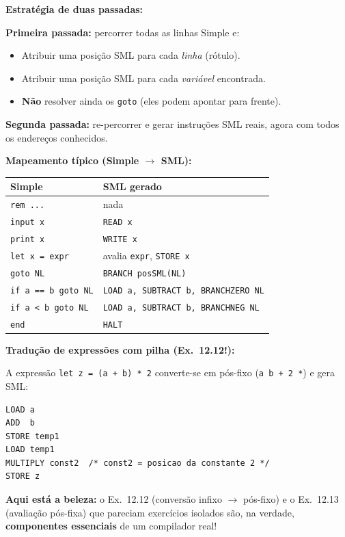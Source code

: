 \documentclass[12pt,a4paper]{article}
\begin{document}
\begin{respostabox}
\textbf{Estratégia de duas passadas:}

\textbf{Primeira passada:} percorrer todas as linhas Simple e:
\begin{itemize}[noitemsep]
  \item Atribuir uma posição SML para cada \textit{linha} (rótulo).
  \item Atribuir uma posição SML para cada \textit{variável} encontrada.
  \item \textbf{Não} resolver ainda os \texttt{goto} (eles podem apontar
  para frente).
\end{itemize}

\textbf{Segunda passada:} re-percorrer e gerar instruções SML reais, agora com
todos os endereços conhecidos.

\textbf{Mapeamento típico (Simple $\to$ SML):}

\begin{center}
\renewcommand{\arraystretch}{1.3}
\begin{tabular}{l l}
\toprule
\textbf{Simple} & \textbf{SML gerado} \\ \midrule
\texttt{rem ...}              & nada \\
\texttt{input x}              & \texttt{READ x} \\
\texttt{print x}              & \texttt{WRITE x} \\
\texttt{let x = expr}         & avalia \texttt{expr}, \texttt{STORE x} \\
\texttt{goto NL}              & \texttt{BRANCH posSML(NL)} \\
\texttt{if a == b goto NL}    & \texttt{LOAD a, SUBTRACT b, BRANCHZERO NL} \\
\texttt{if a < b goto NL}     & \texttt{LOAD a, SUBTRACT b, BRANCHNEG NL} \\
\texttt{end}                  & \texttt{HALT} \\
\bottomrule
\end{tabular}
\end{center}

\textbf{Tradução de expressões com pilha (Ex.~12.12!):}

A expressão \texttt{let z = (a + b) * 2} converte-se em pós-fixo
(\texttt{a b + 2 *}) e gera SML:
\begin{lstlisting}
LOAD a
ADD  b
STORE temp1
LOAD temp1
MULTIPLY const2  /* const2 = posicao da constante 2 */
STORE z
\end{lstlisting}

\textbf{Aqui está a beleza:} o Ex.~12.12 (conversão infixo $\to$ pós-fixo) e o
Ex.~12.13 (avaliação pós-fixa) que pareciam exercícios isolados são, na verdade,
\textbf{componentes essenciais} de um compilador real!
\end{respostabox}
\end{document}
